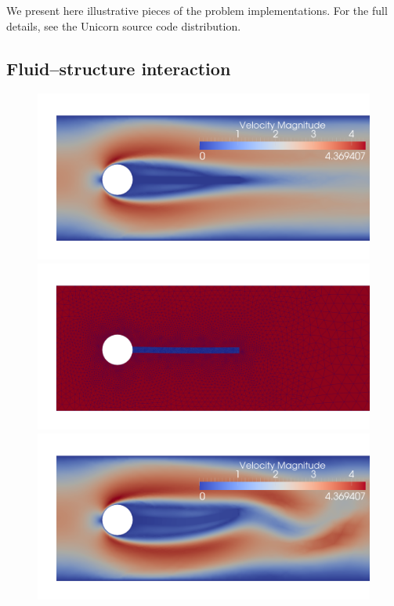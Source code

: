 We present here illustrative pieces of the problem
implementations. For the full details, see the Unicorn source code
distribution.

\subsection{Fluid--structure interaction}

\begin{figure}
  \centering
  \includegraphics[width=\largefig]{chapters/hoffman-2/png/fsi3_vel_050.png}\\
  \includegraphics[width=\largefig]{chapters/hoffman-2/png/fsi3_theta_050.png}\\
  \includegraphics[width=\largefig]{chapters/hoffman-2/png/fsi3_vel_250.png}\\

\end{figure}
